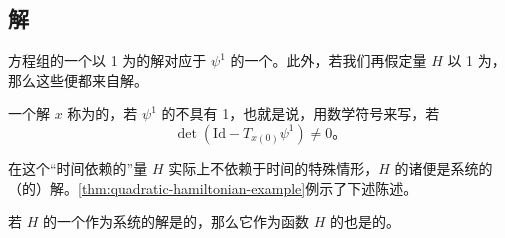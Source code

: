 \subsection{\trNondegenerate\trPeriodic{}解}
\label{subsec:nondegenerate-periodic-solutions}

\trDifferential{}方程组的一个以 1 为\trPeriodic{}的\trPeriodic{}解对应于\trDiffeomorphism{} $\psi^1$ 的一个\trFixedPoint。此外，若我们再假定\trHamiltonian{}量 $H$ 以 1 为\trPeriodic，那么这些\trFixedPoint{}便都来自\trPeriodic{}解。

\begin{definition}\label{thm:nondegenerate-periodic-solution}
一个\trPeriodic{}解 $x$ 称为\trNondegenerate{}的，若 $\psi^1$ 的\trDifferential{}不具有\trEigenvalue{} 1，也就是说，用数学符号来写，若
\[
\det(\mathrm{Id}-T_{x(0)}\psi^1)\neq 0\text{。}
\]
\end{definition}

在这个“时间依赖的”\trHamiltonian{}量 $H$ 实际上不依赖于时间的特殊情形，$H$ 的诸\trCriticalPoint{}便是\trHamiltonian{}系统的（\trStationary{}的）\trPeriodic{}解。\cref{thm:quadratic-hamiltonian-example}例示了下述陈述。

\begin{proposition}\label{thm:critical-nondegenerate-transfer}
若 $H$ 的一个\trCriticalPoint{}作为\trHamiltonian{}系统的\trPeriodic{}解是\trNondegenerate{}的，那么它作为函数 $H$ 的\trCriticalPoint{}也是\trNondegenerate{}的。
\end{proposition}

